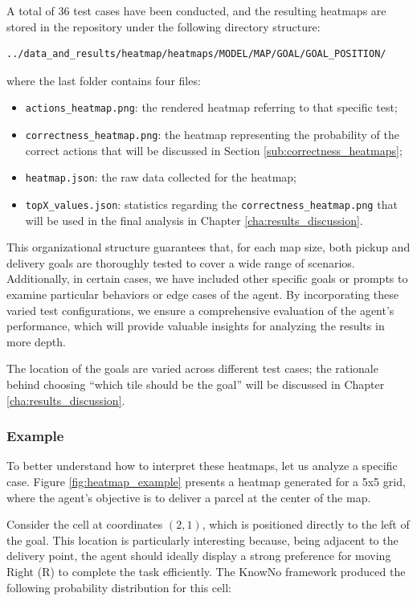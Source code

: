A total of 36 test cases have been conducted, and the resulting heatmaps are stored
in the repository under the following directory structure:
\begin{verbatim}
../data_and_results/heatmap/heatmaps/MODEL/MAP/GOAL/GOAL_POSITION/
\end{verbatim}
where the last folder contains four files:
\begin{itemize}
  \item \texttt{actions\_heatmap.png}: the rendered heatmap referring to that specific
    test;

  \item \texttt{correctness\_heatmap.png}: the heatmap representing the probability
    of the correct actions that will be discussed in Section \ref{sub:correctness_heatmaps};

  \item \texttt{heatmap.json}: the raw data collected for the heatmap;

  \item \texttt{topX\_values.json}: statistics regarding the \texttt{correctness\_heatmap.png}
    that will be used in the final analysis in Chapter
    \ref{cha:results_discussion}.
\end{itemize}

This organizational structure guarantees that, for each map size, both pickup
and delivery goals are thoroughly tested to cover a wide range of scenarios. Additionally,
in certain cases, we have included other specific goals or prompts to examine particular
behaviors or edge cases of the agent. By incorporating these varied test
configurations, we ensure a comprehensive evaluation of the agent's performance,
which will provide valuable insights for analyzing the results in more depth.

The location of the goals are varied across different test cases; the rationale behind
choosing ``which tile should be the goal'' will be discussed in Chapter \ref{cha:results_discussion}.

\subsubsection{Example}

To better understand how to interpret these heatmaps, let us analyze a specific case.
Figure \ref{fig:heatmap_example} presents a heatmap generated for a 5x5 grid, where
the agent's objective is to deliver a parcel at the center of the map.

Consider the cell at coordinates $(2,1)$, which is positioned directly to the
left of the goal. This location is particularly interesting because, being
adjacent to the delivery point, the agent should ideally display a strong preference
for moving Right (R) to complete the task efficiently. The KnowNo framework
produced the following probability distribution for this cell:


